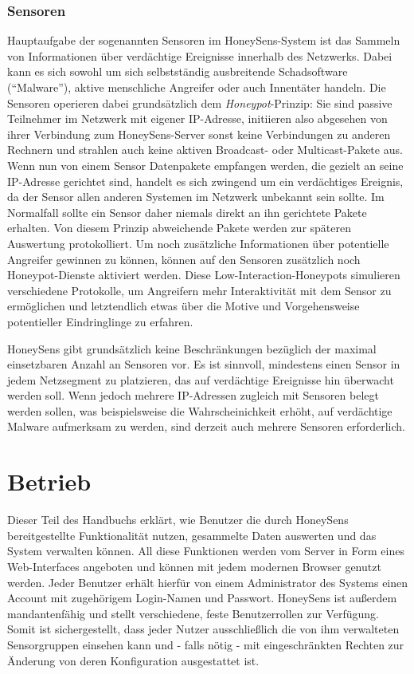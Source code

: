 \documentclass[12pt]{article}
\begin{document}
\section{Sensoren}
Hauptaufgabe der sogenannten Sensoren im HoneySens-System ist das Sammeln von Informationen über verdächtige Ereignisse innerhalb des Netzwerks. Dabei kann es sich sowohl um sich selbstständig ausbreitende Schadsoftware ("`Malware"'), aktive menschliche Angreifer oder auch Innentäter handeln. Die Sensoren operieren dabei grundsätzlich dem \textit{Honeypot}-Prinzip: Sie sind passive Teilnehmer im Netzwerk mit eigener IP-Adresse, initiieren also abgesehen von ihrer Verbindung zum HoneySens-Server sonst keine Verbindungen zu anderen Rechnern und strahlen auch keine aktiven Broadcast- oder Multicast-Pakete aus. Wenn nun von einem Sensor Datenpakete empfangen werden, die gezielt an seine IP-Adresse gerichtet sind, handelt es sich zwingend um ein verdächtiges Ereignis, da der Sensor allen anderen Systemen im Netzwerk unbekannt sein sollte. Im Normalfall sollte ein Sensor daher niemals direkt an ihn gerichtete Pakete erhalten. Von diesem Prinzip abweichende Pakete werden zur späteren Auswertung protokolliert. Um noch zusätzliche Informationen über potentielle Angreifer gewinnen zu können, können auf den Sensoren zusätzlich noch Honeypot-Dienste aktiviert werden. Diese Low-Interaction-Honeypots simulieren verschiedene Protokolle, um Angreifern mehr Interaktivität mit dem Sensor zu ermöglichen und letztendlich etwas über die Motive und Vorgehensweise potentieller Eindringlinge zu erfahren.

HoneySens gibt grundsätzlich keine Beschränkungen bezüglich der maximal einsetzbaren Anzahl an Sensoren vor. Es ist sinnvoll, mindestens einen Sensor in jedem Netzsegment zu platzieren, das auf verdächtige Ereignisse hin überwacht werden soll. Wenn jedoch mehrere IP-Adressen zugleich mit Sensoren belegt werden sollen, was beispielsweise die Wahrscheinichkeit erhöht, auf verdächtige Malware aufmerksam zu werden, sind derzeit auch mehrere Sensoren erforderlich.

\newpage
\part{Betrieb} \label{usage}
Dieser Teil des Handbuchs erklärt, wie Benutzer die durch HoneySens bereitgestellte Funktionalität nutzen, gesammelte Daten auswerten und das System verwalten können. All diese Funktionen werden vom Server in Form eines Web-Interfaces angeboten und können mit jedem modernen Browser genutzt werden. Jeder Benutzer erhält hierfür von einem Administrator des Systems einen Account mit zugehörigem Login-Namen und Passwort. HoneySens ist außerdem mandantenfähig und stellt verschiedene, feste Benutzerrollen zur Verfügung. Somit ist sichergestellt, dass jeder Nutzer ausschließlich die von ihm verwalteten Sensorgruppen einsehen kann und - falls nötig - mit eingeschränkten Rechten zur Änderung von deren Konfiguration ausgestattet ist.
\end{document}

